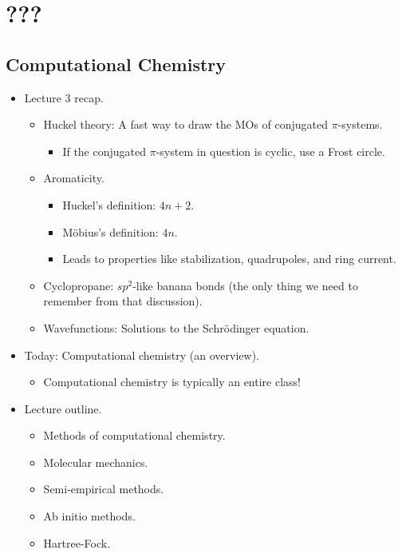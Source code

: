 \documentclass[../notes.tex]{subfiles}
\begin{document}
\chapter{???}
\section{Computational Chemistry}
\begin{itemize}
    \item {}Lecture 3 recap.
    \begin{itemize}
        \item Huckel theory: A fast way to draw the MOs of conjugated $\pi$-systems.
        \begin{itemize}
            \item If the conjugated $\pi$-system in question is cyclic, use a Frost circle.
        \end{itemize}
        \item Aromaticity.
        \begin{itemize}
            \item Huckel's definition: $4n+2$.
            \item M\"{o}bius's definition: $4n$.
            \item Leads to properties like stabilization, quadrupoles, and ring current.
        \end{itemize}
        \item Cyclopropane: $sp^2$-like banana bonds (the only thing we need to remember from that discussion).
        \item Wavefunctions: Solutions to the Schr\"{o}dinger equation.
    \end{itemize}
    \item Today: Computational chemistry (an overview).
    \begin{itemize}
        \item Computational chemistry is typically an entire class!
    \end{itemize}
    \item Lecture outline.
    \begin{itemize}
        \item Methods of computational chemistry.
        \item Molecular mechanics.
        \item Semi-empirical methods.
        \item Ab initio methods.
        \item Hartree-Fock.

\end{itemize}
\end{itemize}
\end{document}
